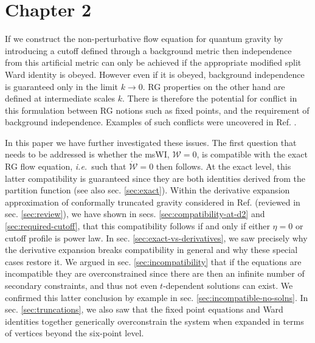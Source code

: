 \documentclass[11pt]{book} %
\newcommand\ie{\textit{i.e.}\ }
\numberwithin{equation}{chapter}
\begin{document}
\section*{Chapter 2}

If we construct the non-perturbative flow equation for quantum gravity by introducing a cutoff defined through
a background metric then independence from this artificial metric can only be achieved if the appropriate
modified split Ward identity is obeyed. However even if it is obeyed, background independence is guaranteed
only in the limit $k\to0$.
RG properties on the other hand are defined at intermediate scales $k$.
There is therefore the potential for conflict in this formulation between RG notions such as fixed points,
and the requirement of background independence.
Examples of such conflicts were uncovered in Ref. \cite{Dietz:2015owa}.

In this paper we have further investigated these issues.
The first question that needs to be addressed is whether the msWI,
$\mathcal{W}=0$, is compatible with the exact RG flow equation, \ie such that $\dot{\mathcal{W}}=0$ then follows.
At the exact level, this latter compatibility is guaranteed since they are both identities derived from the
partition function (see also sec. \ref{sec:exact}).
Within the derivative expansion approximation of conformally truncated gravity considered in Ref.
\cite{Dietz:2015owa} (reviewed in sec. \ref{sec:review}),
we have shown  in secs. \ref{sec:compatibility-at-d2} and \ref{sec:required-cutoff},
that this compatibility follows if and only if either $\eta=0$ or cutoff profile is power law.
In sec. \ref{sec:exact-vs-derivatives}, we saw precisely why the derivative expansion breaks compatibility
in general and why these special cases restore it.
We argued in sec. \ref{sec:incompatibility} that if the equations are incompatible they are overconstrained
since there are then an infinite number of secondary constraints,
and thus not even $t$-dependent solutions can exist.
We confirmed this latter conclusion by example in sec. \ref{sec:incompatible-no-solns}.
In sec. \ref{sec:truncations},
we also saw that the fixed point equations and Ward identities together generically overconstrain the
system when expanded in terms of vertices beyond the six-point level.
\end{document}

